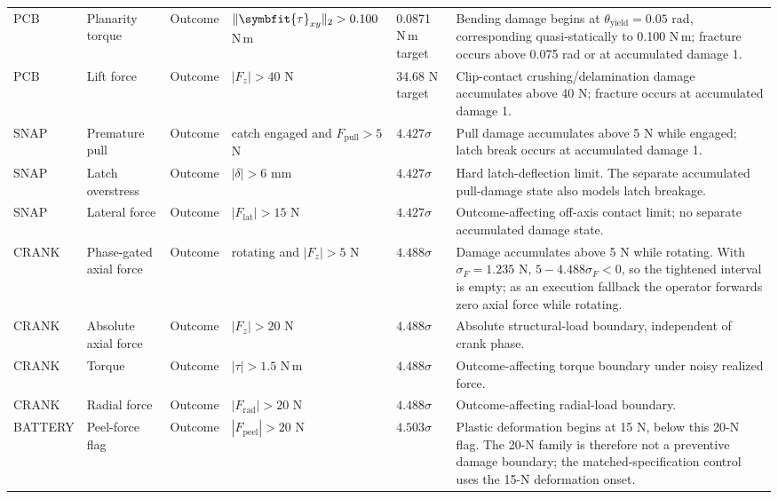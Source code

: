 \documentclass[10pt]{article}
\begin{document}
\begin{longtable}{@{}L{0.60in}L{1.00in}L{0.60in}L{1.35in}L{0.83in}L{1.83in}@{}}
\midrule

PCB &
Planarity torque &
Outcome &
$\|\symbfit{\tau}_{xy}\|_2>0.100$ N\,m &
0.0871 N\,m target &
Bending damage begins at $\theta_{\mathrm{yield}}=0.05$ rad, corresponding
quasi-statically to 0.100 N\,m; fracture occurs above 0.075 rad or at accumulated damage 1.
\\

PCB &
Lift force &
Outcome &
$|F_z|>40$ N &
34.68 N target &
Clip-contact crushing/delamination damage accumulates above 40 N; fracture
occurs at accumulated damage 1.
\\

\midrule

SNAP &
Premature pull &
Outcome &
catch engaged and $F_{\mathrm{pull}}>5$ N &
$4.427\sigma$ &
Pull damage accumulates above 5 N while engaged; latch break occurs at
accumulated damage 1.
\\

SNAP &
Latch overstress &
Outcome &
$|\delta|>6$ mm &
$4.427\sigma$ &
Hard latch-deflection limit. The separate accumulated pull-damage state also
models latch breakage.
\\

SNAP &
Lateral force &
Outcome &
$|F_{\mathrm{lat}}|>15$ N &
$4.427\sigma$ &
Outcome-affecting off-axis contact limit; no separate accumulated damage state.
\\

\midrule

CRANK &
Phase-gated axial force &
Outcome &
rotating and $|F_z|>5$ N &
$4.488\sigma$ &
Damage accumulates above 5 N while rotating. With
$\sigma_F=1.235$ N, $5-4.488\sigma_F<0$, so the tightened interval is empty; as an execution fallback the operator forwards zero axial force while rotating.
\\

CRANK &
Absolute axial force &
Outcome &
$|F_z|>20$ N &
$4.488\sigma$ &
Absolute structural-load boundary, independent of crank phase.
\\

CRANK &
Torque &
Outcome &
$|\tau|>1.5$ N\,m &
$4.488\sigma$ &
Outcome-affecting torque boundary under noisy realized force.
\\

CRANK &
Radial force &
Outcome &
$|F_{\mathrm{rad}}|>20$ N &
$4.488\sigma$ &
Outcome-affecting radial-load boundary.
\\

\midrule

BATTERY &
Peel-force flag &
Outcome &
$|F_{\mathrm{peel}}|>20$ N &
$4.503\sigma$ &
Plastic deformation begins at 15 N, below this 20-N flag. The 20-N family is
therefore not a preventive damage boundary; the matched-specification control
uses the 15-N deformation onset.
\\


\end{longtable}
\end{document}
